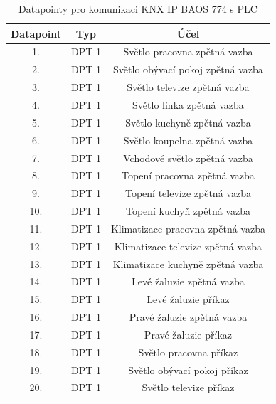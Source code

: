 \begin{table}[!ht]
  \caption[Datapointy pro komunikaci KNX IP BAOS 774 s PLC]{Datapointy pro komunikaci KNX IP BAOS 774 s PLC}
  \label{tab:Datapointy pro komunikaci KNX IP BAOS 774 s PLC}
  \small
    \centering
    \begin{tabular}{|c|c|c|}
      \hline
        Datapoint & Typ & Účel  \\
          \hline\hline
            1. & DPT 1 & Světlo pracovna zpětná vazba \\
          \hline
            2. & DPT 1 & Světlo obývací pokoj zpětná vazba \\
          \hline
            3. & DPT 1 & Světlo televize zpětná vazba \\
          \hline
            4. & DPT 1 & Světlo linka zpětná vazba \\
          \hline
            5. & DPT 1 & Světlo kuchyně zpětná vazba \\
          \hline
            6. & DPT 1 & Světlo koupelna zpětná vazba \\
          \hline
            7. & DPT 1 & Vchodové světlo zpětná vazba \\
          \hline
            8. & DPT 1 & Topení pracovna zpětná vazba \\
          \hline
            9. & DPT 1 & Topení televize zpětná vazba \\
          \hline
            10. & DPT 1 & Topení kuchyň zpětná vazba \\
          \hline
            11. & DPT 1 & Klimatizace pracovna zpětná vazba \\
          \hline
            12. & DPT 1 & Klimatizace televize zpětná vazba \\
          \hline
            13. & DPT 1 & Klimatizace kuchyně zpětná vazba \\
          \hline
            14. & DPT 1 & Levé žaluzie zpětná vazba \\
          \hline
            15. & DPT 1 & Levé žaluzie příkaz \\
          \hline
            16. & DPT 1 & Pravé žaluzie zpětná vazba \\
          \hline
            17. & DPT 1 & Pravé žaluzie příkaz \\
          \hline
            18. & DPT 1 & Světlo pracovna příkaz \\
          \hline
            19. & DPT 1 & Světlo obývací pokoj příkaz \\
          \hline
            20. & DPT 1 & Světlo televize příkaz \\

\end{tabular}
\end{table}
